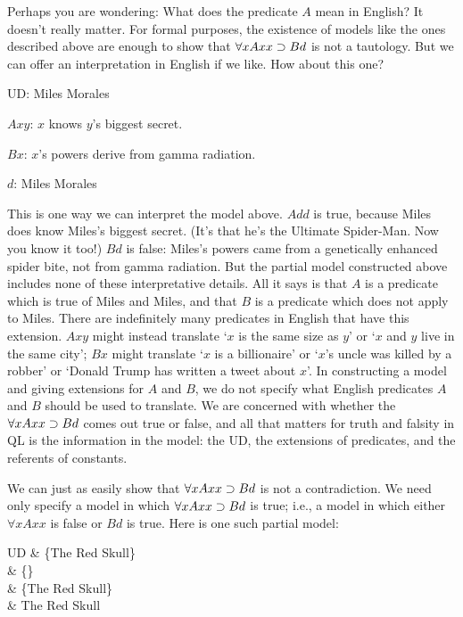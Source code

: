 Perhaps you are wondering: What does the predicate $A$ mean in English? It doesn't really matter. For formal purposes, the existence of models like the ones described above are enough to show that $\forall x Axx \supset Bd$ is not a tautology. But we can offer an interpretation in English if we like. How about this one?

\begin{ekey}
\item[UD:] Miles Morales
\item[$Axy$:] $x$ knows $y$'s biggest secret.
\item[$Bx$:] $x$'s powers derive from gamma radiation.
\item[$d$:] Miles Morales
\end{ekey}

This is one way we can interpret the model above. $Add$ is true, because Miles does know Miles's biggest secret. (It's that he's the Ultimate Spider-Man. Now you know it too!) $Bd$ is false: Miles's powers came from a genetically enhanced spider bite, not from gamma radiation. But the partial model constructed above includes none of these interpretative details. All it says is that $A$ is a predicate which is true of Miles and Miles, and that $B$ is a predicate which does not apply to Miles. There are indefinitely many predicates in English that have this extension. $Axy$ might instead translate `$x$ is the same size as $y$' or `$x$ and $y$ live in the same city'; $Bx$ might  translate `$x$ is a billionaire' or `$x$'s uncle was killed by a robber' or `Donald Trump has written a tweet about $x$'. In constructing a model and giving extensions for $A$ and $B$, we do not specify what English predicates $A$ and $B$ should be used to translate. We are concerned with whether the $\forall xAxx \supset Bd$ comes out true or false, and all that matters for truth and falsity in QL is the information in the model: the UD, the extensions of predicates, and the referents of constants.

We can just as easily show that $\forall xAxx \supset Bd$ is not a contradiction. We need only specify a model in which $\forall xAxx \supset Bd$ is true; i.e., a model in which either $\forall x Axx$ is false or $Bd$ is true. Here is one such partial model:

\begin{partialmodel}
	UD			& \{The Red Skull\}\\
	 	& \{\}\\
		& \{The Red Skull\}\\
		& The Red Skull
\end{partialmodel}

